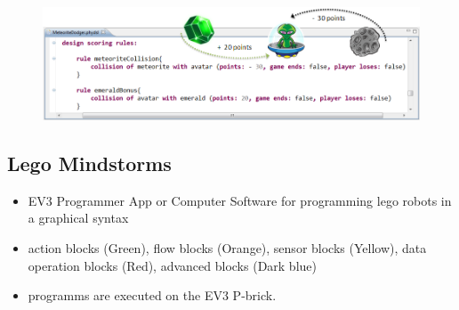 \documentclass[runningheads,a4paper]{llncs}
\begin{document}
\begin{figure}[H]
      \centering
      \includegraphics[width=\textwidth]{images/PhyDSL4.PNG}
      \label{rulesdef}
    \end{figure}


   \subsection{Lego Mindstorms}
  \begin{itemize}
  \item EV3 Programmer App or Computer Software for programming lego robots in a graphical syntax 
  \item action blocks (Green), flow blocks (Orange), sensor blocks (Yellow), data operation blocks (Red), advanced blocks (Dark blue)
  \item programms are executed on the EV3 P-brick. 
  \end{itemize}
  
\end{document}
